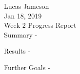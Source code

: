 \documentclass[12pt]{article}
\begin{document}
\noindent Lucas Jameson\\
Jan 18, 2019 \\
Week 2 Progress Report \\

Summary - 

Results - 

Further Goals - 
\end{document}

